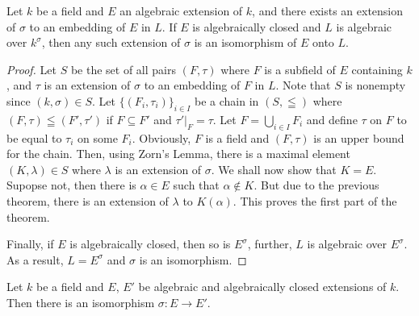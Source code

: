 \begin{theorem}
    Let $k$ be a field and $E$ an algebraic extension of $k$, and there exists an extension of $\sigma$ to an embedding of $E$ in $L$. If $E$ is algebraically closed and $L$ is algebraic over $k^\sigma$, then any such extension of $\sigma$ is an isomorphism of $E$ onto $L$.
\end{theorem}
\begin{proof}
    Let $S$ be the set of all pairs $(F,\tau)$ where $F$ is a subfield of $E$ containing $k$, and $\tau$ is an extension of $\sigma$ to an embedding of $F$ in $L$. Note that $S$ is nonempty since $(k,\sigma)\in S$. Let $\{(F_i,\tau_i)\}_{i\in I}$ be a chain in $(S,\leqq)$ where $(F,\tau)\leqq(F',\tau')$ if $F\subseteq F'$ and $\tau'|_{F} = \tau$. Let $F = \bigcup_{i\in I}F_i$ and define $\tau$ on $F$ to be equal to $\tau_i$ on some $F_i$. Obviously, $F$ is a field and $(F,\tau)$ is an upper bound for the chain. Then, using Zorn's Lemma, there is a maximal element $(K,\lambda)\in S$ where $\lambda$ is an extension of $\sigma$. We shall now show that $K = E$. Supopse not, then there is $\alpha\in E$ such that $\alpha\notin K$. But due to the previous theorem, there is an extension of $\lambda$ to $K(\alpha)$. This proves the first part of the theorem.

    Finally, if $E$ is algebraically closed, then so is $E^\sigma$, further, $L$ is algebraic over $E^\sigma$. As a result, $L = E^\sigma$ and $\sigma$ is an isomorphism.
\end{proof}

\begin{corollary}
    Let $k$ be a field and $E$, $E'$ be algebraic and algebraically closed extensions of $k$. Then there is an isomorphism $\sigma: E\to E'$.
\end{corollary}

